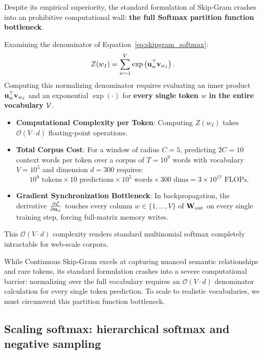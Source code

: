 \documentclass[../../main.tex]{subfiles}
\begin{document}
Despite its empirical superiority, the standard formulation of Skip-Gram crashes into an prohibitive computational wall: \textbf{the full Softmax partition function bottleneck}.

Examining the denominator of Equation~\eqref{eq:skipgram_softmax}:
\begin{equation}
\label{eq:partition_function}
Z(w_I) = \sum_{w=1}^V \exp\left( \mathbf{u}_w^\top \mathbf{v}_{w_I} \right).
\end{equation}
Computing this normalizing denominator requires evaluating an inner product $\mathbf{u}_w^\top \mathbf{v}_{w_I}$ and an exponential $\exp(\cdot)$ for \textbf{every single token $w$ in the entire vocabulary $\mathcal{V}$}.
\begin{itemize}
    \item \textbf{Computational Complexity per Token}: Computing $Z(w_I)$ takes $\mathcal{O}(V \cdot d)$ floating-point operations.
    \item \textbf{Total Corpus Cost}: For a window of radius $C = 5$, predicting $2C = 10$ context words per token over a corpus of $T = 10^9$ words with vocabulary $V = 10^5$ and dimension $d = 300$ requires:
    \begin{equation}
    \label{eq:flops_wall}
    10^9 \text{ tokens} \times 10 \text{ predictions} \times 10^5 \text{ words} \times 300 \text{ dims} = 3 \times 10^{17} \text{ FLOPs}.
    \end{equation}
    \item \textbf{Gradient Synchronization Bottleneck}: In backpropagation, the derivative $\frac{\partial \mathcal{L}}{\partial \mathbf{u}_w}$ touches every column $w \in \{1, \dots, V\}$ of $\mathbf{W}_{\text{out}}$ on every single training step, forcing full-matrix memory writes.
\end{itemize}
This $\mathcal{O}(V \cdot d)$ complexity renders standard multinomial softmax completely intractable for web-scale corpora.

While Continuous Skip-Gram excels at capturing nuanced semantic relationships and rare tokens, its standard formulation crashes into a severe computational barrier: normalizing over the full vocabulary requires an $\mathcal{O}(V \cdot d)$ denominator calculation for every single token prediction. To scale to realistic vocabularies, we must circumvent this partition function bottleneck.

\clearpage


\subsection{Scaling softmax: hierarchical softmax and negative sampling}
\label{sec:scaling_softmax}
\end{document}
